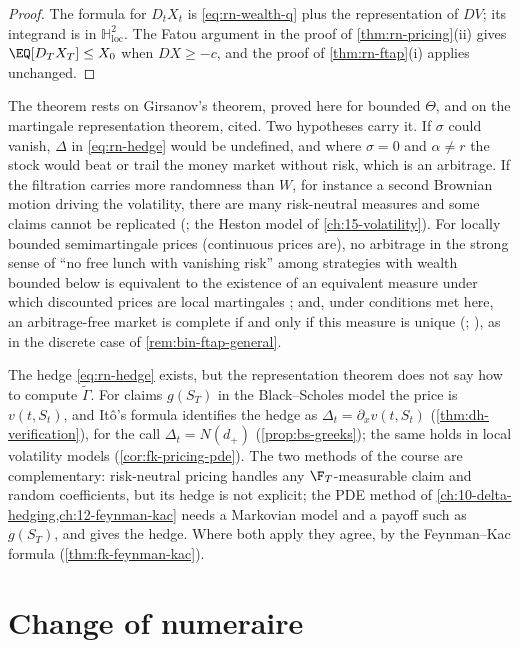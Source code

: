 \begin{proof}
The formula for $D_tX_t$ is \eqref{eq:rn-wealth-q} plus the representation of $DV$; its
integrand is in $\mathbb H^2_{\mathrm{loc}}$. The Fatou argument in the proof of
\cref{thm:rn-pricing}(ii) gives $\EQ[D_TX_T]\le X_0$ when $D X\ge-c$, and the proof of
\cref{thm:rn-ftap}(i) applies unchanged.
\end{proof}

The theorem rests on Girsanov's theorem, proved here for bounded $\Theta$, and on the
martingale representation theorem, cited. Two hypotheses carry it. If $\sigma$ could vanish, $\Delta$ in \eqref{eq:rn-hedge} would be undefined, and where
$\sigma=0$ and $\alpha\ne r$ the stock would beat or trail the money market without risk,
which is an arbitrage. If the filtration carries more randomness than
$W$, for instance a second Brownian motion driving the volatility, there are many
risk-neutral measures and some claims cannot be replicated (; the
Heston model of \cref{ch:15-volatility}). For locally bounded semimartingale prices (continuous prices are), no arbitrage in the strong sense of
``no free lunch with vanishing risk'' among strategies with wealth bounded below is
equivalent to the existence of an equivalent measure under which discounted prices are
local martingales \citep{delbaen-schachermayer-1994}; and, under conditions met here, an
arbitrage-free market is complete if and only if this measure is unique
(\textcite{harrison-pliska}; \textcite{harrison-pliska-1983}), as in the discrete case of
\cref{rem:bin-ftap-general}.

The hedge \eqref{eq:rn-hedge} exists, but the representation theorem does not say how to
compute $\widetilde\Gamma$. For claims $g(S_T)$ in the Black--Scholes model the price is
$v(t,S_t)$, and It\^o's formula identifies the hedge as $\Delta_t=\partial_xv(t,S_t)$
(\cref{thm:dh-verification}), for the call $\Delta_t=N(d_+)$ (\cref{prop:bs-greeks}); the same
holds in local volatility models (\cref{cor:fk-pricing-pde}). The two methods of the course
are complementary: risk-neutral pricing handles any $\F_T$-measurable claim and random
coefficients, but its hedge is not explicit; the PDE method of
\cref{ch:10-delta-hedging,ch:12-feynman-kac} needs a Markovian model and a payoff such as
$g(S_T)$, and gives the hedge. Where both apply they agree, by the Feynman--Kac formula
(\cref{thm:fk-feynman-kac}).

\section{Change of numeraire}\label{sec:rn-numeraire}

